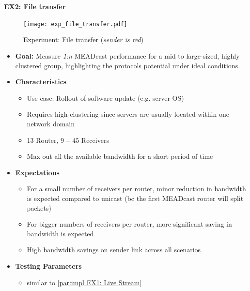 \newpage


\paragraph{EX2: File transfer} %
\label{par:implEX2: File transfer}

\begin{figure}[!htbp]
    \begin{center}
        \texttt{[image: exp\_file\_transfer.pdf]}
    \end{center}
    \caption{Experiment: File transfer (\textit{sender is red})}
    \label{fig:exp_file_transfer}
\end{figure}

\begin{itemize}\itemsep0em
    \item \textbf{Goal:} Measure \textit{1:n} MEADcast performance for a
        mid to large-sized, highly clustered group, highlighting the protocols
        potential under ideal conditions.
    \item[] \textbf{Characteristics}
    \begin{itemize}\itemsep0em
        \item Use case: Rollout of software update (e.g. server OS)
        \item Requires high clustering since servers are usually located within
            one network domain
        \item 13 Router, $9-45$ Receivers
        \item Max out all the available bandwidth for a short period of time
            \cite{cartesian_us_bw}
    \end{itemize}
    \item[] \textbf{Expectations}
    \begin{itemize}\itemsep0em
        \item For a small number of receivers per router, minor reduction in
            bandwidth is expected compared to unicast (bc the first MEADcast
            router will split packets)
        \item For bigger numbers of receivers per router, more significant
            saving in bandwidth is expected
        \item High bandwidth savings on sender link across all scenarios
    \end{itemize}
    \item[] \textbf{Testing Parameters}
    \begin{itemize}\itemsep0em
        \item similar to \autoref{par:impl EX1: Live Stream}
    \end{itemize}
\end{itemize}
\newpage


